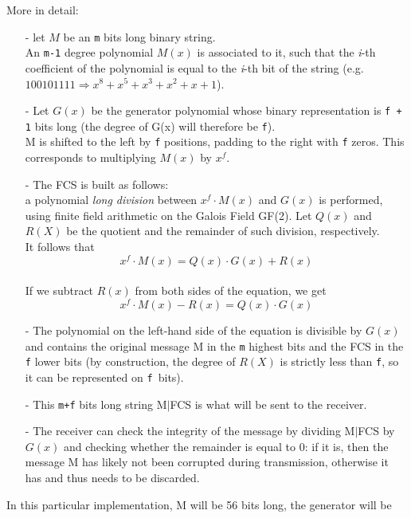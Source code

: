\noindent More in detail:
\begin{itemize}[leftmargin=0pt, topsep=0pt,itemsep=-1ex,partopsep=1ex,parsep=1ex]
	\item[-] let $M$ be an \texttt{m} bits long binary string.\\
	An \texttt{m-1} degree polynomial $M(x)$ is associated to it, such that the \textit{i}-th coefficient of the polynomial is equal to the \textit{i}-th bit of the string (e.g. $100101111 \Rightarrow x^{8} + x^{5} + x^{3} + x^{2} + x + 1$).\\
	\item[-] Let $G(x)$ be the generator polynomial whose binary representation is \texttt{f + 1} bits long (the degree of G(x) will therefore be \texttt{f}).\\
M is shifted to the left by \texttt{f} positions, padding to the right with \texttt{f} zeros. This corresponds to multiplying $M(x)$ by $x^f$.\\
	\item[-] The FCS is built as follows:\\
	a polynomial \textit{long division} between $x^{f}{\cdot}M(x)$ and $G(x)$ is performed, using finite field arithmetic on the Galois Field GF(2). Let $Q(x)$ and $R(X)$ be the quotient and the remainder of such division, respectively. \\
	It follows that 
	\begin{equation}
		x^{f}{\cdot}M(x) = Q(x)\cdot G(x) + R(x)
		\label{eq:polynomial1}
	\end{equation}
\\
	If we subtract $R(x)$ from both sides of the equation, we get
	\begin{equation}
			x^{f}{\cdot}M(x) - R(x) = Q(x)\cdot G(x)
			\label{eq:polynomial2}
	\end{equation}
	\item[-] The polynomial on the left-hand side of the equation is divisible by $G(x)$ and contains the original message M in the \texttt{m} highest bits and the FCS in the \texttt{f} lower bits (by construction, the degree of $R(X)$ is strictly less than \texttt{f}, so it can be represented on \texttt{f }bits).\\
	\item[-] This \texttt{m+f} bits long string M{$|$}FCS is what will be sent to the receiver.\\
	\item[-] The receiver can check the integrity of the message by dividing M{$|$}FCS by $G(x)$ and checking whether the remainder is equal to 0: if it is, then the message M has likely not been corrupted during transmission, otherwise it has and thus needs to be discarded.
\end{itemize}
\hfill \break
In this particular implementation, M will be 56 bits long, the generator will be

